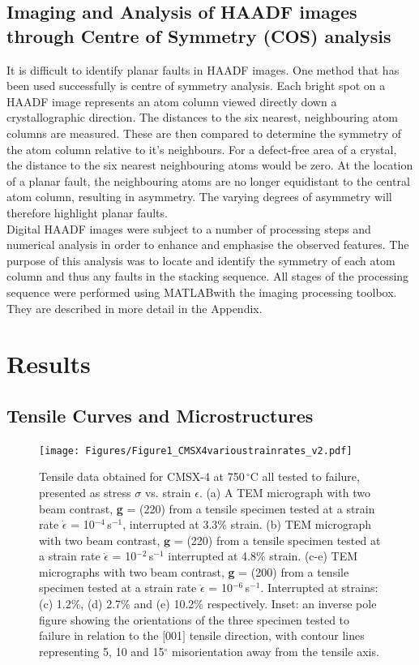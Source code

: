 \documentclass[a4paper,12pt,times,numbered,print,index]{Classes/PhDThesisPSnPDF}
\begin{document}
\subsection*{Imaging and Analysis of HAADF images through Centre of Symmetry (COS) analysis}\label{section:COS}
It is difficult to identify planar faults in HAADF images. One method that has been used successfully is centre of symmetry analysis. Each bright spot on a HAADF image represents an atom column viewed directly down a crystallographic direction. The distances to the six nearest, neighbouring atom columns are measured. These are then compared to determine the symmetry of the atom column relative to it's neighbours. For a defect-free area of a crystal, the distance to the six nearest neighbouring atoms would be zero. At the location of a planar fault, the neighbouring atoms are no longer equidistant to the central atom column, resulting in asymmetry. The varying degrees of asymmetry will therefore highlight planar faults.\\
Digital HAADF images were subject to a number of processing steps and numerical analysis in order to enhance and emphasise the observed features. The purpose of this analysis was to locate and identify the symmetry of each atom column and thus any faults in the stacking sequence. All stages of the processing sequence were performed using MATLAB\textregistered with the imaging processing toolbox. They are described in more detail in the Appendix.


\section*{Results}
\subsection*{Tensile Curves and Microstructures}
\begin{figure}
\centering
\texttt{[image: Figures/Figure1\_CMSX4varioustrainrates\_v2.pdf]}
\caption{Tensile data obtained for CMSX-4 at 750\,$^\circ$C all tested to failure, presented as stress $\sigma$ vs. strain $\epsilon$. (a) A TEM micrograph with two beam contrast, \textbf{g} = (220) from a tensile specimen tested at a strain rate $\dot{\epsilon}$ = 10$^{-4}$\,s$^{-1}$, interrupted at 3.3\% strain. (b) TEM micrograph with two beam contrast, $\textbf{g}$ = (220) from a tensile specimen tested at a strain rate $\dot{\epsilon}$ = 10$^{-2}$\,s$^{-1}$ interrupted at 4.8\% strain. (c-e) TEM micrographs with two beam contrast, \textbf{g} = (200) from a tensile specimen tested at a strain rate $\dot{\epsilon}$ = 10$^{-6}$\,s$^{-1}$. Interrupted at strains:  (c) 1.2\%, (d) 2.7\% and (e) 10.2\% respectively. Inset: an inverse pole figure showing the orientations of the three specimen tested to failure in relation to the $[$001$]$ tensile direction, with contour lines representing 5, 10 and 15$^\circ$ misorientation away from the tensile axis.}
\label{fig:x4_stressstrain}
\end{figure}
\end{document}
